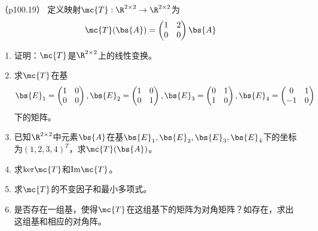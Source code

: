 \documentclass[12pt, a4paper, oneside, UTF8]{ctexbook}
\begin{document}
\begin{question}（p100.19）
定义映射$\mc{T}:\R^{2 \times 2} \rightarrow \R^{2\times 2}$为
\begin{align*}
    \mc{T}(\bs{A})=\begin{pmatrix}
        1 & 2\\
        0 & 0
    \end{pmatrix} \bs{A}
\end{align*}
\begin{enumerate}[label=(\arabic*)]
    \item 证明：$\mc{T}$是$\R^{2 \times 2}$上的线性变换。
    \item 求$\mc{T}$在基
    \begin{align*}
        \bs{E}_1=\begin{pmatrix}
            1  & 0\\
            0 & 0
        \end{pmatrix},\bs{E}_2=\begin{pmatrix}
            1  & 0\\
            0 & 1
        \end{pmatrix},\bs{E}_3=\begin{pmatrix}
            0  & 1\\
            1 & 0
        \end{pmatrix},\bs{E}_4=\begin{pmatrix}
            0  & 1\\
            -1 & 0
        \end{pmatrix}
    \end{align*}下的矩阵。
    \item 已知$\R^{2 \times 2}$中元素$\bs{A}$在基$\bs{E}_1,\bs{E}_2,\bs{E}_3,\bs{E}_4$下的坐标为$(1,2,3,4)^T$，求$\mc{T}(\bs{A})$。
    \item 求$\mathrm{ker}\mc{T}$和$\mathrm{Im}\mc{T}$。
    \item 求$\mc{T}$的不变因子和最小多项式。
    \item 是否存在一组基，使得$\mc{T}$在这组基下的矩阵为对角矩阵？如存在，求出这组基和相应的对角阵。
\end{enumerate}
\end{question}
\end{document}
